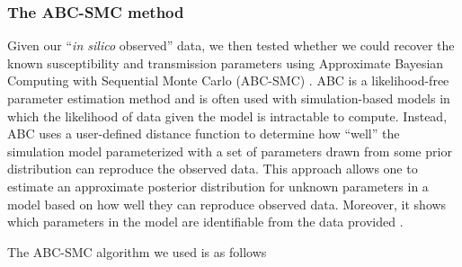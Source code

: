 \documentclass[11pt]{article}
\begin{document}
\subsubsection{The ABC-SMC method}

Given our ``\emph{in silico} observed'' data, we then tested whether we could recover the known susceptibility and transmission parameters using Approximate Bayesian Computing
with Sequential Monte Carlo (ABC-SMC) \citep{Sisson2009,Toni2009,Beaumont2010,Kosmala2015}. ABC is a likelihood-free parameter estimation method and is often used with simulation-based
models in which the likelihood of data given the model is
intractable to compute. Instead, ABC uses a user-defined distance
function to determine how ``well'' the simulation model parameterized
with a set of parameters drawn from some prior distribution can
reproduce the observed data. This approach allows one to estimate an
approximate posterior distribution for unknown parameters in a model based
on how well they can reproduce observed data.  Moreover, it shows which parameters in the model are identifiable  from the data provided \citep{Toni2009}.

The ABC-SMC algorithm we used is as follows \citep{Toni2009,Sisson2009,Beaumont2010}
\end{document}
